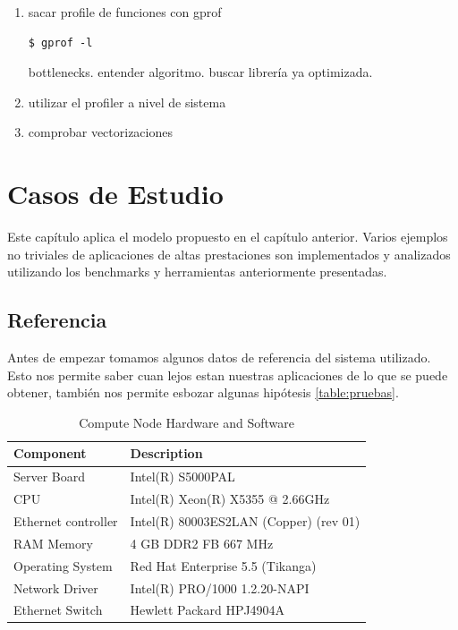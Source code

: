 \documentclass[a4paper]{report}
\begin{document}
\begin{enumerate}
\item sacar profile de funciones con gprof

\begin{verbatim}
$ gprof -l
\end{verbatim}

bottlenecks. entender algoritmo. buscar librer\'ia ya optimizada.

\item utilizar el profiler a nivel de sistema

\item comprobar vectorizaciones

\end{enumerate}

\chapter{Casos de Estudio}

Este cap\'itulo aplica el modelo propuesto en el cap\'itulo anterior. Varios ejemplos no triviales de aplicaciones de altas prestaciones son implementados
y analizados utilizando los benchmarks y herramientas anteriormente presentadas.

\section{Referencia}

Antes de empezar tomamos algunos datos de referencia del sistema utilizado.
Esto nos permite saber cuan lejos estan nuestras aplicaciones de lo que se
puede obtener, tambi\'en nos permite esbozar algunas hip\'otesis \ref{table:pruebas}.

\begin{table}[H]
    \caption{Compute Node Hardware and Software}
    \centering
    \begin{tabular}{|l|l|}\hline
      {\bf Component} & {\bf Description} \\ \hline
      Server Board & Intel(R) S5000PAL \\ \hline
      CPU & Intel(R) Xeon(R) X5355 @ 2.66GHz \\ \hline
      Ethernet controller & Intel(R) 80003ES2LAN (Copper) (rev 01) \\ \hline
      RAM Memory & 4 GB DDR2 FB 667 MHz \\ \hline
      Operating System & Red Hat Enterprise 5.5 (Tikanga) \\ \hline
      Network Driver & Intel(R) PRO/1000 1.2.20-NAPI \\ \hline
      Ethernet Switch & Hewlett Packard HPJ4904A \\ \hline
    \end{tabular}
    \label{table:testbed}
\end{table}
\end{document}
